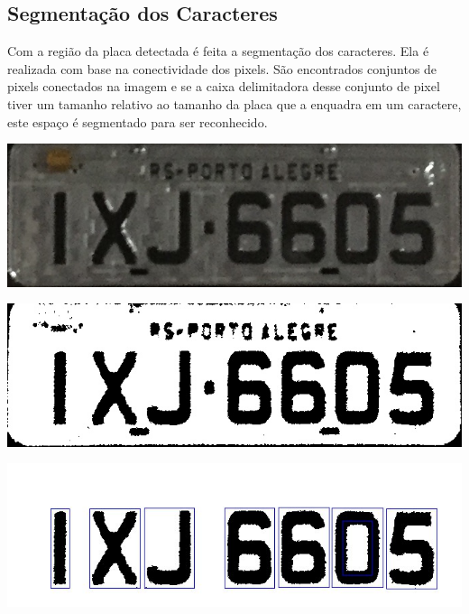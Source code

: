 \documentclass[a0,portrait]{a0poster}
\begin{document}
\begin{multicols}{2}
\color{NavyBlue}
\subsection*{Segmentação dos Caracteres}
\color{Black}
\Large
\justifying

Com a região da placa detectada é feita a segmentação dos caracteres. Ela é realizada
com base na conectividade dos pixels. São encontrados conjuntos de pixels conectados na imagem e
se a caixa delimitadora desse conjunto de pixel tiver um tamanho relativo ao tamanho da placa
que a enquadra em um caractere, este espaço é segmentado para ser reconhecido.

\vspace{2cm}

\begin{center}
	\includegraphics[width=0.68\linewidth]{10roi.jpg}
	\label{fig:license_plate}
\end{center}

\vspace{2cm}

\begin{center}
	\includegraphics[width=0.68\linewidth]{a02fill_binary.jpg}
	\label{fig:plate_filled}
\end{center}

\begin{center}
	\includegraphics[width=0.68\linewidth]{character_segmentation.jpg}
	\label{fig:character_segmentation}
\end{center}


\end{multicols}
\end{document}

